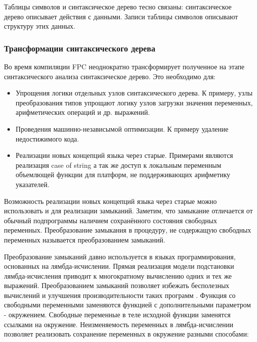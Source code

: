 \documentclass{imcs}
\begin{document}
Таблицы символов и синтаксическое дерево тесно связаны: синтаксическое дерево описывает действия с
данными. Записи таблицы символов описывают структуру этих данных.

\subsubsection{Трансформации синтаксического дерева}

Во время компиляции FPC неоднократно трансформирует полученное на этапе синтаксического 
анализа синтаксическое дерево. Это необходимо для:
\begin{itemize}
    \item Упрощения логики отдельных узлов синтаксического дерева. К 
примеру, узлы преобразования типов упрощают логику узлов загрузки значения переменных,
арифметических операций и др. выражений.
    \item Проведения машинно-независымой оптимизации. К примеру удаление недостижимого
кода.
    \item Реализации новых концепций языка через старые. Примерами являются реализация
case of string\cite{misha} а так же доступ к локальным переменным объемлющей функции для
платформ, не поддерживающих арифметику указателей.
\end{itemize}      

Возможность реализации новых концепций языка через старые можно использовать и
для реализации замыканий. Заметим, что замыкание отличается от 
обычный подпрограммы наличием сохранённого состояния свободных переменных. Преобразование
замыкания в процедуру, не содержащую свободных переменных называется преобразованием
замыканий\cite{moderncompiler}.

Преобразование замыканий давно используется в языках программирования, основанных на
лямбда-исчислении. Прямая реализация модели подстановки
лямбда-исчисления приводит к многократному вычислению одних и тех же выражений.
Преобразованием замыканий позволяет избежать бесполезных вычислений
и улучшения производительности таких программ \cite{lambdaclosure95}. 
Функция со свободными переменными
заменяются функцией с дополнительными параметром - окружением. Свободные переменные
в теле исходной функции заменятся ссылками на окружение.  
Неизменяемость переменных в лямбда-исчислении позволяет реализовать сохранение
переменных в окружение разными способами:

\end{document}
